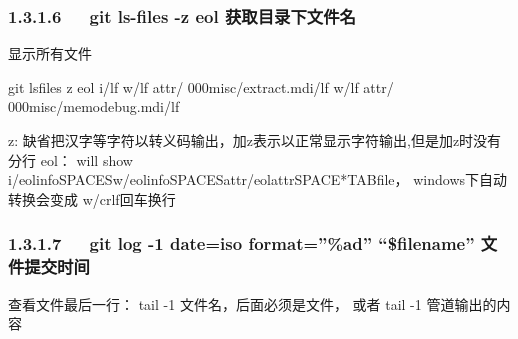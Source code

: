 \documentclass[letterpaper,12pt,english]{sphinxmanual}
\begin{document}
\subsubsection{1.3.1.6   git ls-files -z \textendash{}eol 获取目录下文件名}
\label{\detokenize{001software/001install/001._u7f51_u7ad9/github:git-ls-files-z-eol}}
显示所有文件


\begin{sphinxVerbatim}[commandchars=\\\{\}]
\PYGZdl{} git ls\PYGZhy{}files \PYGZhy{}z \PYGZhy{}\PYGZhy{}eol
i/lf    w/lf    attr/                   000misc/extract.mdi/lf    w/lf    attr/                   000misc/memo\PYGZhy{}debug.mdi/lf

\PYGZhy{}z: 缺省把汉字等字符以\PYGZbs{}转义码输出，加z表示以正常显示字符输出,但是加z时没有分行
\PYGZhy{}\PYGZhy{}eol： will show i/\PYGZlt{}eolinfo\PYGZgt{}\PYGZlt{}SPACES\PYGZgt{}w/\PYGZlt{}eolinfo\PYGZgt{}\PYGZlt{}SPACES\PYGZgt{}attr/\PYGZlt{}eolattr\PYGZgt{}\PYGZlt{}SPACE*\PYGZgt{}\PYGZlt{}TAB\PYGZgt{}\PYGZlt{}file\PYGZgt{}， windows下自动转换会变成 w/crlf回车换行
\end{sphinxVerbatim}


\subsubsection{1.3.1.7   git log -1 \textendash{}date=iso \textendash{}format=”\%ad” \textendash{} “\$filename” 文件提交时间}
\label{\detokenize{001software/001install/001._u7f51_u7ad9/github:git-log-1-date-iso-format-ad-filename}}

查看文件最后一行： tail -1 文件名，后面必须是文件， 或者 \textbar{} tail -1 管道输出的内容
\end{document}
